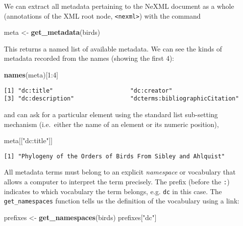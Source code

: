 \documentclass[author-year, review, 11pt]{components/elsarticle} %
\newenvironment{Shaded}{\begin{snugshade}}{\end{snugshade}}
\newcommand{\KeywordTok}[1]{\textcolor[rgb]{0.13,0.29,0.53}{\textbf{{#1}}}}
\newcommand{\DecValTok}[1]{\textcolor[rgb]{0.00,0.00,0.81}{{#1}}}
\newcommand{\StringTok}[1]{\textcolor[rgb]{0.31,0.60,0.02}{{#1}}}
\newcommand{\NormalTok}[1]{{#1}}
\begin{document}
We can extract all metadata pertaining to the NeXML document as a whole
(annotations of the XML root node,
\texttt{\textless{}nexml\textgreater{}}) with the command

\begin{Shaded}
\begin{Highlighting}[]
\NormalTok{meta <-}\StringTok{ }\KeywordTok{get_metadata}\NormalTok{(birds) }
\end{Highlighting}
\end{Shaded}

This returns a named list of available metadata. We can see the kinds of
metadata recorded from the names (showing the first 4):

\begin{Shaded}
\begin{Highlighting}[]
\KeywordTok{names}\NormalTok{(meta)[}\DecValTok{1}\NormalTok{:}\DecValTok{4}\NormalTok{]}
\end{Highlighting}
\end{Shaded}

\begin{verbatim}
[1] "dc:title"                      "dc:creator"                   
[3] "dc:description"                "dcterms:bibliographicCitation"
\end{verbatim}

and can ask for a particular element using the standard list sub-setting
mechanism (i.e.~either the name of an element or its numeric position),

\begin{Shaded}
\begin{Highlighting}[]
\NormalTok{meta[[}\StringTok{"dc:title"}\NormalTok{]]}
\end{Highlighting}
\end{Shaded}

\begin{verbatim}
[1] "Phylogeny of the Orders of Birds From Sibley and Ahlquist"
\end{verbatim}

All metadata terms must belong to an explicit \emph{namespace} or
vocabulary that allows a computer to interpret the term precisely. The
prefix (before the \texttt{:}) indicates to which vocabulary the term
belongs, e.g. \texttt{dc} in this case. The \texttt{get\_namespaces}
function tells us the definition of the vocabulary using a link:

\begin{Shaded}
\begin{Highlighting}[]
\NormalTok{prefixes <-}\StringTok{ }\KeywordTok{get_namespaces}\NormalTok{(birds)}
\NormalTok{prefixes[}\StringTok{"dc"}\NormalTok{]}
\end{Highlighting}
\end{Shaded}
\end{document}
